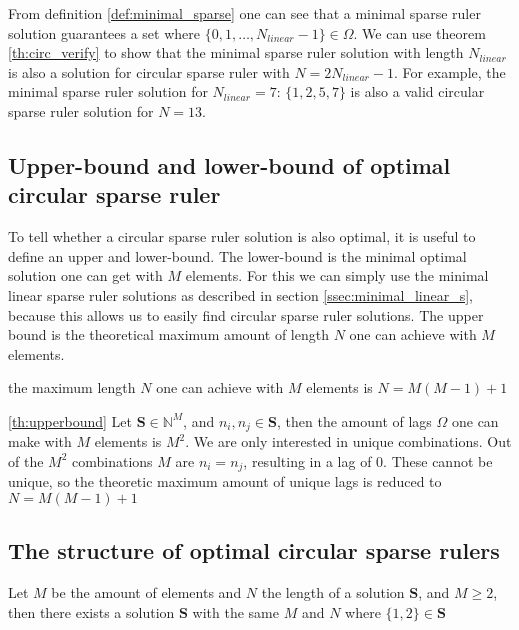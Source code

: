 \documentclass[a4paper, openany, oneside]{memoir}
\begin{document}
From definition \ref{def:minimal_sparse} one can see that a minimal sparse ruler solution guarantees a set where $\{0,1,\dots,N_{linear}-1\} \in \Omega$. We can use theorem \ref{th:circ_verify} to show that the minimal sparse ruler solution with length $N_{linear}$ is also a solution for circular sparse ruler with $N=2N_{linear}-1$.
For example, the minimal sparse ruler solution for $N_{linear}=7$: $\{1,2,5,7\}$ is also a valid circular sparse ruler solution for $N=13$.

\subsection{Upper-bound and lower-bound of optimal circular sparse ruler}
To tell whether a circular sparse ruler solution is also optimal, it is useful to define an upper and lower-bound. The lower-bound is the minimal optimal solution one can get with $M$ elements. For this we can simply use the minimal linear sparse ruler solutions as described in section \ref{ssec:minimal_linear_s}, because this allows us to easily find circular sparse ruler solutions. The upper bound is the theoretical maximum amount of length $N$ one can achieve with $M$ elements.

\begin{blockTheorem} \label{th:upperbound}\nolinebreak
    the maximum length $N$ one can achieve with $M$ elements is $N=M(M-1)+1$\nolinebreak
\end{blockTheorem}

\begin{blockProofTheorem}{\ref{th:upperbound}}
    Let $\mathbf{S} \in \mathbb{N}^M$, and $n_i,n_j \in \mathbf{S}$, then the amount of lags $\Omega$ one can make with $M$ elements is $M^2$. We are only interested in unique combinations. Out of the $M^2$ combinations $M$ are $n_i=n_j$, resulting in a lag of 0. These cannot be unique, so the theoretic maximum amount of unique lags is reduced to $N=M(M-1)+1$
\end{blockProofTheorem}

\subsection{The structure of optimal circular sparse rulers}

\begin{blockTheorem} \label{th:lag1}\nolinebreak
    Let $M$ be the amount of elements and $N$ the length of a solution $\mathbf{S}$, and $M\geq 2$, then there exists a solution $\mathbf{S}$ with the same $M$ and $N$ where $\{1,2\} \in \mathbf{S}$  \nolinebreak
\end{blockTheorem}
\end{document}

